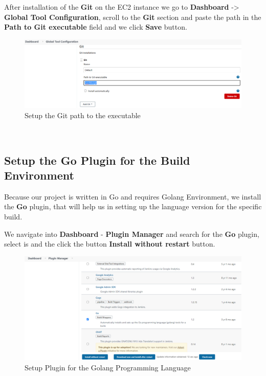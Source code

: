 \documentclass[12pt,a4paper,twoside]{article}
\begin{document}
After installation of the \textbf{Git} on the EC2 instance we go to \textbf{Dashboard} -> \textbf{Global Tool Configuration}, scroll to the \textbf{Git} section and paste the path in the \textbf{Path to Git executable} field and we click \textbf{Save} button.


\begin{figure}[H]
    \centering
        \includegraphics[width=15cm]{images-aws/29-jenkins-git-set-path.png}
        \caption{Setup the Git path to the  executable}
\end{figure}



~\newpage


\subsection{Setup the Go Plugin for the Build Environment}


Because our project is written in Go and requires Golang Environment, we install the \textbf{Go} plugin, that will help us in setting up the language version for the specific build.

We navigate into \textbf{Dashboard} - \textbf{Plugin Manager} and search for the \textbf{Go} plugin, select is and the click the button \textbf{Install without restart} button.


\begin{figure}[h!]
    \centering
        \includegraphics[width=15cm]{images-aws/30-go-plugin.png}
        \caption{Setup Plugin for the Golang Programming Language}
\end{figure}
\end{document}
